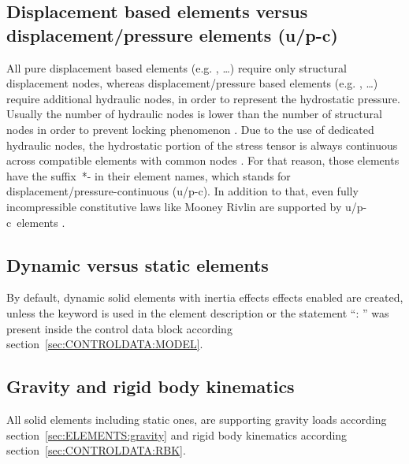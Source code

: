 \subsection{Displacement based elements versus displacement/pressure elements (u/p-c)}
All pure displacement based elements (e.g. , \ldots) require only structural displacement nodes,
whereas displacement/pressure based elements (e.g. , \ldots) require
additional hydraulic nodes, in order to represent the hydrostatic pressure.
Usually the number of hydraulic nodes is lower than the number of structural nodes in order to prevent
locking phenomenon \cite{BATHE2016}.
Due to the use of dedicated hydraulic nodes, the hydrostatic portion of the stress tensor is always continuous
across compatible elements with common nodes \cite{BATHE2016}. For that reason, those elements have the
suffix~*- in their element names, which stands for displacement/pressure-continuous (u/p-c).
In addition to that, even fully incompressible constitutive laws like Mooney Rivlin are supported
by u/p-c~elements \cite{BATHE2016}.

\subsection{Dynamic versus static elements}
By default, dynamic solid elements with inertia effects effects enabled are created,
unless the keyword  is used in the element description
or the statement ``: '' was present inside the control data block according section~\ref{sec:CONTROLDATA:MODEL}.
\subsection{Gravity and rigid body kinematics}
All solid elements including static ones, are supporting gravity loads according section~\ref{sec:ELEMENTS:gravity}
and rigid body kinematics according section~\ref{sec:CONTROLDATA:RBK}.
